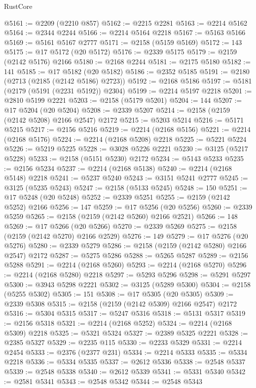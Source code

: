 \begin{lexlean}{RustCore}
\begin{coremodule}
@5161 := @2209 (@2210 @857)
@5162 := @2215 @2281
@5163 := @2214 @5162
@5164 := @2344 @2244
@5166 := @2214 @5164 @2218
@5167 := @5163 @5166
@5169 := @5161 @5167 @2777
@5171 := @2158 (@5159 @5169)
@5172 := 143
@5175 := @17 @5172 (@20 @5172)
@5176 := @2339 @5175
@5179 := @2159 (@2142 @5176) @2166
@5180 := @2168 @2244
@5181 := @2175 @5180
@5182 := 141
@5185 := @17 @5182 (@20 @5182)
@5186 := @2352 @5185
@5191 := @2180 (@2713 (@2185 (@2142 @5186) @2723))
@5192 := @2168 @5186
@5197 := @5181 (@2179 (@5191 (@2231 @5192)) @2304)
@5199 := @2214 @5197 @2218
@5201 := @2810 @5199 @2221
@5203 := @2158 (@5179 @5201)
@5204 := 144
@5207 := @17 @5204 (@20 @5204)
@5208 := @2339 @5207
@5214 := @2158 (@2159 (@2142 @5208) @2166 @2547) @2172
@5215 := @5203 @5214
@5216 := @5171 @5215
@5217 := @2156 @5216
@5219 := @2214 (@2168 @5156)
@5221 := @2214 (@2168 @5176)
@5224 := @2214 (@2168 @5208) @2218
@5225 := @5221 @5224
@5226 := @5219 @5225
@5228 := @3028 @5226 @2221
@5230 := @3125 (@5217 @5228)
@5233 := @2158 (@5151 @5230) @2172
@5234 := @5143 @5233
@5235 := @2156 @5234
@5237 := @2214 (@2168 @5138)
@5240 := @2214 (@2168 @5148) @2218
@5241 := @5237 @5240
@5243 := @3151 @5241 @2777
@5245 := @3125 (@5235 @5243)
@5247 := @2158 (@5133 @5245)
@5248 := 150
@5251 := @17 @5248 (@20 @5248)
@5252 := @2339 @5251
@5255 := @2159 (@2142 @5252) @2166
@5256 := 147
@5259 := @17 @5256 (@20 @5256)
@5260 := @2339 @5259
@5265 := @2158 (@2159 (@2142 @5260) @2166 @2521)
@5266 := 148
@5269 := @17 @5266 (@20 @5266)
@5270 := @2339 @5269
@5275 := @2158 (@2159 (@2142 @5270) @2166 @2529)
@5276 := 149
@5279 := @17 @5276 (@20 @5276)
@5280 := @2339 @5279
@5286 := @2158 (@2159 (@2142 @5280) @2166 @2547) @2172
@5287 := @5275 @5286
@5288 := @5265 @5287
@5289 := @2156 @5288
@5291 := @2214 (@2168 @5260)
@5293 := @2214 (@2168 @5270)
@5296 := @2214 (@2168 @5280) @2218
@5297 := @5293 @5296
@5298 := @5291 @5297
@5300 := @3943 @5298 @2221
@5302 := @3125 (@5289 @5300)
@5304 := @2158 (@5255 @5302)
@5305 := 151
@5308 := @17 @5305 (@20 @5305)
@5309 := @2339 @5308
@5315 := @2158 (@2159 (@2142 @5309) @2166 @2547) @2172
@5316 := @5304 @5315
@5317 := @5247 @5316
@5318 := @5131 @5317
@5319 := @2156 @5318
@5321 := @2214 (@2168 @5252)
@5324 := @2214 (@2168 @5309) @2218
@5325 := @5321 @5324
@5327 := @2389 @5325 @2221
@5328 := @2385 @5327
@5329 := @2235 @115
@5330 := @2233 @5329
@5331 := @2214 @2454
@5333 := @2376 (@2377 @231)
@5334 := @2214 @5333
@5335 := @5334 @2218
@5336 := @5334 @5335
@5337 := @2612 @5336
@5338 := @2548 @5337
@5339 := @2548 @5338
@5340 := @2612 @5339
@5341 := @5331 @5340
@5342 := @2581 @5341
@5343 := @2548 @5342
@5344 := @2548 @5343

\end{coremodule}
\end{lexlean}
